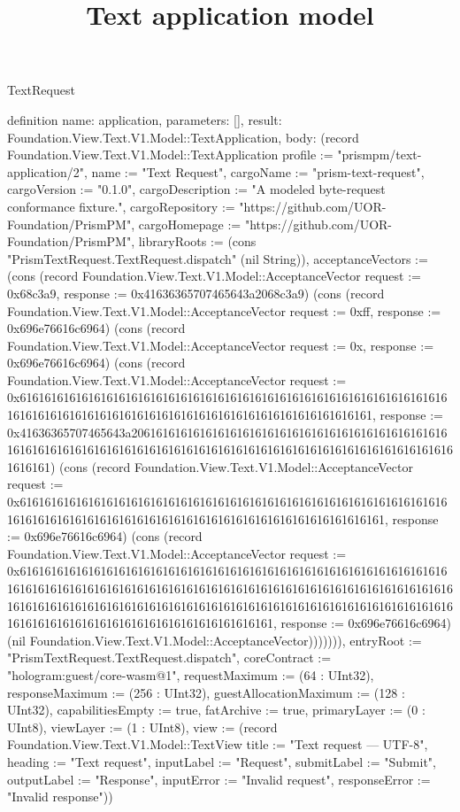 \begin{lexlean}{TextRequest}
\title{Text application model}
\begin{semanticmodule}
definition{
  name: application,
  parameters: [],
  result: Foundation.View.Text.V1.Model::TextApplication,
  body: (record Foundation.View.Text.V1.Model::TextApplication {profile := "prismpm/text-application/2", name := "Text Request", cargoName := "prism-text-request", cargoVersion := "0.1.0", cargoDescription := "A modeled byte-request conformance fixture.", cargoRepository := "https://github.com/UOR-Foundation/PrismPM", cargoHomepage := "https://github.com/UOR-Foundation/PrismPM", libraryRoots := (cons "PrismTextRequest.TextRequest.dispatch" (nil String)), acceptanceVectors := (cons (record Foundation.View.Text.V1.Model::AcceptanceVector {request := 0x68c3a9, response := 0x41636365707465643a2068c3a9}) (cons (record Foundation.View.Text.V1.Model::AcceptanceVector {request := 0xff, response := 0x696e76616c6964}) (cons (record Foundation.View.Text.V1.Model::AcceptanceVector {request := 0x, response := 0x696e76616c6964}) (cons (record Foundation.View.Text.V1.Model::AcceptanceVector {request := 0x61616161616161616161616161616161616161616161616161616161616161616161616161616161616161616161616161616161616161616161616161616161, response := 0x41636365707465643a2061616161616161616161616161616161616161616161616161616161616161616161616161616161616161616161616161616161616161616161616161616161}) (cons (record Foundation.View.Text.V1.Model::AcceptanceVector {request := 0x6161616161616161616161616161616161616161616161616161616161616161616161616161616161616161616161616161616161616161616161616161616161, response := 0x696e76616c6964}) (cons (record Foundation.View.Text.V1.Model::AcceptanceVector {request := 0x6161616161616161616161616161616161616161616161616161616161616161616161616161616161616161616161616161616161616161616161616161616161616161616161616161616161616161616161616161616161616161616161616161616161616161616161616161616161616161616161616161616161616161, response := 0x696e76616c6964}) (nil Foundation.View.Text.V1.Model::AcceptanceVector))))))), entryRoot := "PrismTextRequest.TextRequest.dispatch", coreContract := "hologram:guest/core-wasm@1", requestMaximum := (64 : UInt32), responseMaximum := (256 : UInt32), guestAllocationMaximum := (128 : UInt32), capabilitiesEmpty := true, fatArchive := true, primaryLayer := (0 : UInt8), viewLayer := (1 : UInt8), view := (record Foundation.View.Text.V1.Model::TextView {title := "Text request — UTF-8", heading := "Text request", inputLabel := "Request", submitLabel := "Submit", outputLabel := "Response", inputError := "Invalid request", responseError := "Invalid response"})})
}


\end{semanticmodule}
\end{lexlean}

